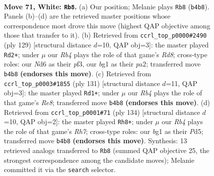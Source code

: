 \documentclass[11pt]{article}
\begin{document}
\clearpage

\begin{figure}[p]\centering
\begin{subfigure}{0.46\textwidth}\centering
\resizebox{\linewidth}{!}{%
\newchessgame
\chessboard[
  setfen={8/8/3Nn2k/P7/1R6/7r/2K5/6b1 w - - 9 71},
  showmover=false,
  pgfstyle=straightmove, color=movearrow, markmove={b4-b8}
]}
\caption{}
\end{subfigure}\hfill
\begin{subfigure}{0.46\textwidth}\centering
\resizebox{\linewidth}{!}{%
\newchessgame
\chessboard[
  setfen={8/8/5k2/7R/p7/5P2/P6K/3r4 b - - 2 65},
  showmover=false,
  pgfstyle=straightmove, color=movearrow, markmove={d1-d2}
]}
\caption{}
\end{subfigure}
\\[4pt]
\begin{subfigure}{0.46\textwidth}\centering
\resizebox{\linewidth}{!}{%
\newchessgame
\chessboard[
  setfen={6k1/R2K2p1/6B1/8/8/8/8/4r3 b - - 36 66},
  showmover=false,
  pgfstyle=straightmove, color=movearrow, markmove={e1-d1}
]}
\caption{}
\end{subfigure}\hfill
\begin{subfigure}{0.46\textwidth}\centering
\resizebox{\linewidth}{!}{%
\newchessgame
\chessboard[
  setfen={2k5/7R/3p4/K2P4/2r5/8/8/8 w - - 7 68},
  showmover=false,
  pgfstyle=straightmove, color=movearrow, markmove={h7-h8}
]}
\caption{}
\end{subfigure}
\caption{\textbf{Move 71, White: \texttt{Rb8}.} (a) Our position; Melanie plays \texttt{Rb8} (\texttt{b4b8}). Panels (b)--(d) are the retrieved master positions whose correspondence most drove this move (highest QAP objective among those that transfer to it). (b) Retrieved from \texttt{ccrl\_top\_p0000\#2490} (ply 129) [structural distance $d$=10, QAP obj=3]: the master played \texttt{Rd2+}; under $\mu$ our \emph{Rb4} plays the role of that game's \emph{Rd8}; cross-type roles: our \emph{N}d6 as their \emph{p}f3, our \emph{b}g1 as their \emph{p}a2; transferred move \texttt{b4b8} \textbf{(endorses this move)}. (c) Retrieved from \texttt{ccrl\_top\_p0003\#1855} (ply 131) [structural distance $d$=11, QAP obj=3]: the master played \texttt{Rd1+}; under $\mu$ our \emph{Rb4} plays the role of that game's \emph{Re8}; transferred move \texttt{b4b8} \textbf{(endorses this move)}. (d) Retrieved from \texttt{ccrl\_top\_p0001\#71} (ply 134) [structural distance $d$=10, QAP obj=2]: the master played \texttt{Rh8+}; under $\mu$ our \emph{Rb4} plays the role of that game's \emph{Rh7}; cross-type roles: our \emph{b}g1 as their \emph{P}d5; transferred move \texttt{b4b8} \textbf{(endorses this move)}. Synthesis: 13 retrieved analogs transferred to \texttt{Rb8} (summed QAP objective 25, the strongest correspondence among the candidate moves); Melanie committed it via the \texttt{search} selector.}
\label{fig:thought-m140}
\end{figure}
\end{document}
